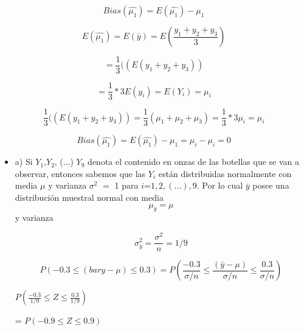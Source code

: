 \documentclass{../oxmathproblems}
\begin{document}
\begin{questions}



\miquestion 


$$ Bias (\hat{\mu_1}) = E(\hat{\mu_1}) - \mu_1 $$ 


$$ E(\hat{\mu_1}) = E(\bar{y}) = E(\frac{y_1+y_2+y_3}{3})  $$ 

$$ = \frac{1}{3} ((E(y_1+y_2+y_3)) $$ 


$$
= \frac{1}{3} * 3E(y_i) = E(Y_i) = \mu_i
$$ 


$$ \frac{1}{3} ((E(y_1+y_2+y_3)) = \frac{1}{3} (\mu_1 + \mu_2 + \mu_3) = \frac{1}{3}* 3 \mu_i = \mu_i $$ 


$$ Bias (\hat{\mu_1}) = E(\hat{\mu_1}) - \mu_1 = \mu_i - \mu_i = 0 $$ 



\miquestion 

\begin{itemize}
\item a) Si $Y_1$,$Y_2$, (...) $Y_9$  denota el contenido en onzas de las botellas que se van a observar, entonces sabemos que las $Y_i$ están distribuidas normalmente con media $\mu$ y varianza $\sigma^2$ $=$ 1 para $i $=$ 1,2, (...),9$. Por lo cual $\bar{y}$ posee una distribución muestral normal con media $$\mu_{\bar{y}} = \mu$$ y varianza 


$$\sigma^2_{\bar{y}} =  \frac{\sigma^2}{n}= 1/9 $$



$$ P(-0.3 \leq (bar{y}-\mu) \leq 0.3) 
= P(\frac{-0.3}{\sigma/n} \leq \frac{(\bar{y}-\mu)}{\sigma/n} \leq \frac{0.3}{\sigma/n})
$$


$P(\frac{-0.3}{1/9} \leq Z \leq \frac{0.3}{1/9})$

= $P(-0.9 \leq Z \leq 0.9) $ 



\end{itemize}
\end{questions}
\end{document}
